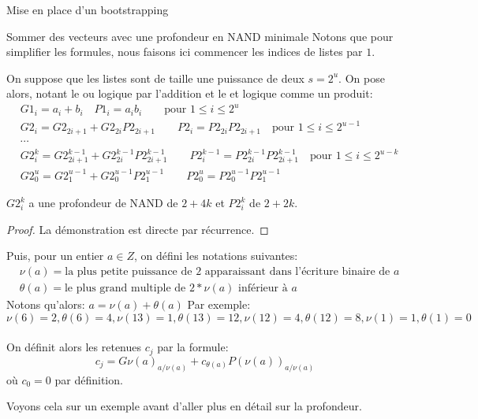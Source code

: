 \begin{section}{Mise en place d'un bootstrapping}
\begin{subsection}{Sommer des vecteurs avec une profondeur en NAND minimale}
Notons que pour simplifier les formules, nous faisons ici commencer les indices
de listes par $1$.


On suppose que les listes sont de  taille une puissance de deux $s = 2^u$. 
On pose alors, notant le ou logique par l'addition et le et logique comme un
produit:
\begin{align*}
&{G1}_i = a_i +  b_i\quad {P1}_i = a_i b_i \qquad \text{pour $1 \leq i
\leq 2^u$}\\
&{G2}_i = {G2}_{2i + 1} + {G2}_{2i}{P2}_{2i + 1}\qquad {P2}_i = {P2}_{2i}
{P2}_{2i + 1} \quad \text{pour $1 \leq i \leq 2^{u-1}$}\\
&\cdots \\
&{G2^k_i} = {G2^{k-1}_{2i + 1}} + {G2^{k-1}_{2i}}{P2^{k-1}_{2i + 1}}\qquad
{P2^{k-1}_i} = {P2^{k-1}_{2i}} {P2^{k-1}_{2i + 1}} \quad \text{pour $1 \leq i
\leq 2^{u-k}$}\\
&{G2^u_0} = {G2^{u-1}_{1}} + {G2^{u-1}_{0}}{P2^{u-1}_{1}}\qquad
{P2^{u}_0} = {P2^{u-1}_{0}} {P2^{u-1}_{1}} 
\end{align*}
\begin{prop} \label{g_et_p}
$G2^k_i$ a une profondeur de NAND de $2 + 4k$ et 
$P2^k_i$ de $2 + 2k$.
\end{prop}
\begin{proof}
La démonstration est directe par récurrence. 
\end{proof}

Puis, pour un entier $a \in Z$, on défini les notations suivantes:
\begin{align*}
&\nu(a) = \text{la plus petite puissance de $2$ apparaissant dans l'écriture
binaire de $a$}\\
&\theta(a) = \text{le plus grand multiple de $2*\nu(a)$ inférieur à $a$}
\end{align*}
Notons qu'alors: $a = \nu(a) + \theta(a)$
Par exemple: 
\[\nu(6) = 2, \theta(6) = 4, \nu(13) = 1, \theta(13) = 12, \nu(12)
= 4, \theta(12) = 8, \nu(1) = 1, \theta(1) = 0\]
\paragraph{}
On définit alors les retenues $c_j$ par la formule:
\[c_j = {G\nu(a)}_{a/\nu(a)} + c_{\theta(a)} {P(\nu(a))}_{a/\nu(a)}\]
où $c_0 = 0$ par définition.

Voyons cela sur un exemple avant d'aller plus en détail sur la profondeur.


\end{subsection}
\end{section}

